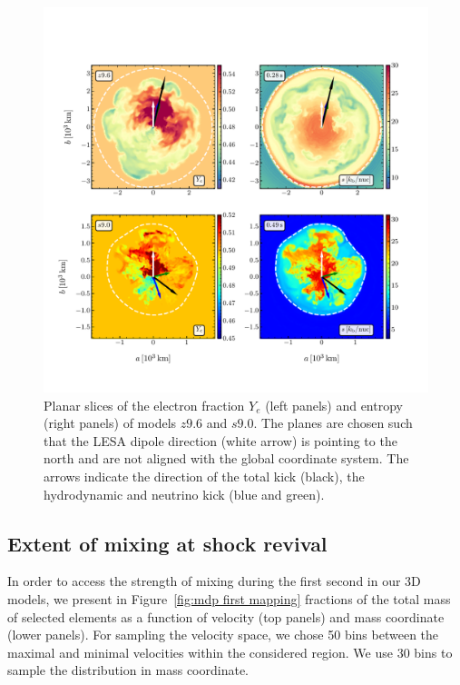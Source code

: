 \documentclass[fleqn,usenatbib]{mnras}
\newcommand{\GEO}[1]{{\color{red}#1}}
\begin{document}
\begin{figure}
 \centering
 \includegraphics[width=\textwidth,trim=0cm 1.3cm 0cm 2cm,clip]{pic/z9_s9_3d_ye_sto_kick_slices_paper.pdf}
 \caption{\GEO{Planar slices of the electron fraction $Y_{e}$ (left panels) and entropy (right panels) of models $z9.6$ and $s9.0$. The planes are chosen such that the LESA dipole direction (white arrow) is pointing to the north and are not aligned with the global coordinate system. The arrows indicate the direction of the total kick (black), the hydrodynamic and neutrino kick (blue and green).}}
 \label{fig:sto ye s9 z9 kick}
\end{figure}

\subsection{Extent of mixing at shock revival}
\label{sec:Extent of mixing at shock revival}

In order to access the strength of mixing during the first second in our 3D models, we present in Figure~\ref{fig:mdp first mapping} fractions of the total mass of selected elements as a function of velocity (top panels) and mass coordinate (lower panels). 
For sampling the velocity space, we chose 50 bins between the maximal and minimal velocities within the considered region. We use 30 bins to sample the distribution in mass coordinate.
\end{document}
